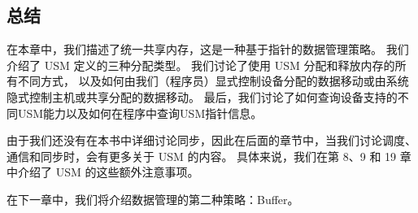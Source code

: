 \subsection{总结}
在本章中，我们描述了统一共享内存，这是一种基于指针的数据管理策略。 
我们介绍了 USM 定义的三种分配类型。 
我们讨论了使用 USM 分配和释放内存的所有不同方式，
以及如何由我们（程序员）显式控制设备分配的数据移动或由系统隐式控制主机或共享分配的数据移动。 
最后，我们讨论了如何查询设备支持的不同USM能力以及如何在程序中查询USM指针信息。

由于我们还没有在本书中详细讨论同步，因此在后面的章节中，当我们讨论调度、通信和同步时，会有更多关于 USM 的内容。 
具体来说，我们在第 8、9 和 19 章中介绍了 USM 的这些额外注意事项。

在下一章中，我们将介绍数据管理的第二种策略：Buffer。